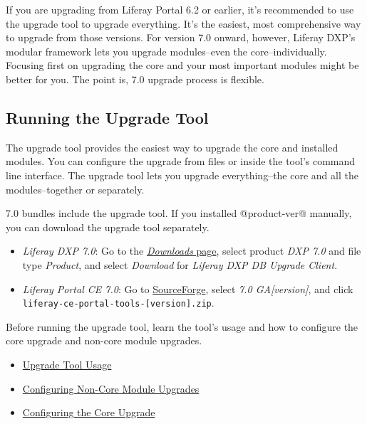 If you are upgrading from Liferay Portal 6.2 or earlier, it's
recommended to use the upgrade tool to upgrade everything. It's the
easiest, most comprehensive way to upgrade from those versions. For
version 7.0 onward, however, Liferay DXP's modular framework lets you
upgrade modules--even the core--individually. Focusing first on
upgrading the core and your most important modules might be better for
you. The point is, 7.0 upgrade process is flexible.

\subsection{Running the Upgrade Tool}\label{running-the-upgrade-tool}

The upgrade tool provides the easiest way to upgrade the core and
installed modules. You can configure the upgrade from files or inside
the tool's command line interface. The upgrade tool lets you upgrade
everything--the core and all the modules--together or separately.

7.0 bundles include the upgrade tool. If you installed @product-ver@
manually, you can download the upgrade tool separately.

\begin{itemize}
\item
  \emph{Liferay DXP 7.0}: Go to the
  \href{https://help.liferay.com/hc}{\emph{Downloads} page}, select
  product \emph{DXP 7.0} and file type \emph{Product}, and select
  \emph{Download} for \emph{Liferay DXP DB Upgrade Client}.
\item
  \emph{Liferay Portal CE 7.0}: Go to
  \href{https://sourceforge.net/projects/lportal/files/Liferay\%20Portal/}{SourceForge},
  select \emph{7.0 GA{[}version{]}}, and click
  \texttt{liferay-ce-portal-tools-{[}version{]}.zip}.
\end{itemize}

Before running the upgrade tool, learn the tool's usage and how to
configure the core upgrade and non-core module upgrades.

\begin{itemize}
\tightlist
\item
  \hyperref[upgrade-tool-usage]{Upgrade Tool Usage}
\item
  \hyperref[configuring-non-core-module-upgrades]{Configuring Non-Core
  Module Upgrades}
\item
  \hyperref[configuring-the-core-upgrade]{Configuring the Core Upgrade}
\end{itemize}

